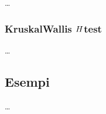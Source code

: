\documentclass[letterpaper,10pt,italian]{jupyterBook}
\begin{document}
\sphinxAtStartPar
… 


\subsubsection{Kruskal\sphinxhyphen{}Wallis \protect\(H\protect\)\sphinxhyphen{}test}
\label{\detokenize{ch/statistics/hp-test-independence:kruskal-wallis-h-test}}\label{\detokenize{ch/statistics/hp-test-independence:hp-test-independence-kruskal-wallis}}
\sphinxAtStartPar
…

\sphinxstepscope


\subsection{Esempi}
\label{\detokenize{ch/statistics/hp-test-examples:esempi}}\label{\detokenize{ch/statistics/hp-test-examples::doc}}
\sphinxAtStartPar
…

\sphinxstepscope
\end{document}
